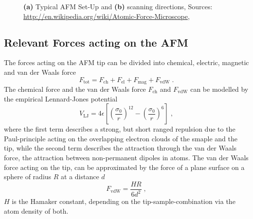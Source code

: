 \documentclass[a4paper]{scrartcl}
\numberwithin{equation}{section}
\numberwithin{figure}{section}
\numberwithin{table}{section}
\newcommand{\eq}[2]{\begin{equation}#1\label{#2}\end{equation}}
\begin{document}
\begin{figure} 
 \centering
{}
 \hfill
{}
\caption{
\small  \textbf{(a)} Typical AFM Set-Up and \textbf{(b)} scanning directions, Sources: \url{http://en.wikipedia.org/wiki/Atomic-Force-Microscope}, \cite{book}  } 
	\label{fig:setup}
\end{figure}



\subsection{Relevant Forces acting on the AFM}
The forces acting on the AFM tip can be divided into chemical, electric, magnetic and van der Waals force
\eq{F_\text{tot}=F_\text{ch}+F_\text{el}+F_\text{mag}+F_\text{vdW} \; .} {forces}
The chemical force and the van der Waals force $F_\text{ch}$ and $F_\text{vdW}$ can be modelled by the empirical Lennard-Jones potential
\eq{V_\text{LJ}=4\epsilon\left[\left(\frac{\sigma_{0}}{r}\right)^{12}-\left(\frac{\sigma_{0}}{r}\right)^{6}\right] \; , }{jones}
where the first term describes a strong, but short ranged repulsion due to the Paul-principle acting on the overlapping electron clouds of the smaple and the tip, while the second term describes the attraction through the van der Waals force, the attraction between non-permanent dipoles in atoms. The van der Waals force acting on the tip, can be approximated by the force of a plane surface on a sphere of radius $R$ at a distance $d$ 
\begin{equation}
F_\text{vdW}=\frac{HR}{6d^{2}} \; ,
\end{equation}
$H$ is the Hamaker constant, depending on the tip-sample-combination via the atom density of both. 
\end{document}
